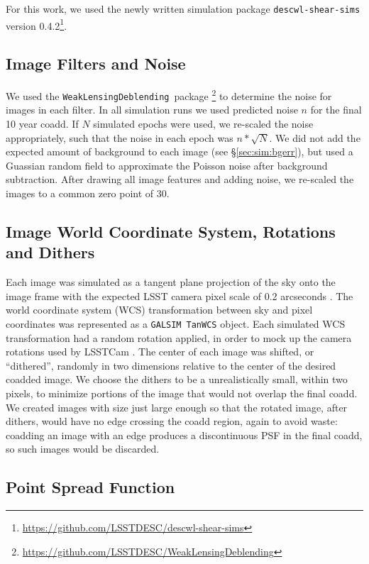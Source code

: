 \documentclass[twocolumn,twocolappendix,astrosym]{openjournal}
\newcommand{\descwl}{\texttt{WeakLensingDeblending}}
\newcommand{\galsim}{\texttt{GALSIM}}
\begin{document}
For this work, we used the newly written simulation package
\texttt{descwl-shear-sims} version
0.4.2\footnote{\url{https://github.com/LSSTDESC/descwl-shear-sims}}.

\subsection{Image Filters and Noise} \label{sec:sim:noise}

We used the \descwl\ package
\citep{DESCWLSanchez2021}\footnote{\url{https://github.com/LSSTDESC/WeakLensingDeblending}}
to determine the noise for images in each filter.  In all simulation runs we
used predicted noise $n$ for the final 10 year coadd.  If $N$ simulated epochs
were used, we re-scaled the noise appropriately, such that the noise in each
epoch was $n * \sqrt{N}$.  We did not add the expected amount of background to
each image (see \S \ref{sec:sim:bgerr}), but used a Guassian random field to
approximate the Poisson noise after background subtraction.  After drawing all
image features and adding noise, we re-scaled the images to a common zero point
of 30.

\subsection{Image World Coordinate System, Rotations and Dithers} \label{sec:sim:rotdith}

Each image was simulated as a tangent plane projection of the sky onto the
image frame with the expected LSST camera pixel scale of 0.2 arcseconds
\citep{IvezicLSST2008}.  The world coordinate system (WCS) transformation between
sky and pixel coordinates was represented as a \galsim\ \texttt{TanWCS} object.
Each simulated WCS transformation had a random rotation applied, in order to
mock up the camera rotations used by LSSTCam \citep{IvezicLSST2008}.  The
center of each image was shifted, or ``dithered'', randomly in two dimensions
relative to the center of the desired coadded image.  We choose the dithers to
be a unrealistically small, within two pixels, to minimize portions of the
image that would not overlap the final coadd.  We created images with size just
large enough so that the rotated image, after dithers, would have no edge
crossing the coadd region, again to avoid waste:  coadding an image with an
edge produces a discontinuous PSF in the final coadd, so such images would be
discarded.

\subsection{Point Spread Function} \label{sec:sim:psfs}
\end{document}
